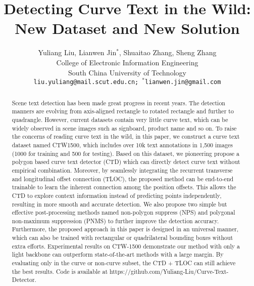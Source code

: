 \documentclass[10pt,twocolumn,letterpaper]{article}
\begin{document}
\title{Detecting Curve Text in the Wild: New Dataset and New Solution}

\author{Yuliang Liu, Lianwen Jin$^{*}$, Shuaitao Zhang, Sheng Zhang\\
College of Electronic Information Engineering\\
South China University of Technology \\
{\tt\small liu.yuliang@mail.scut.edu.cn; $^{*}$lianwen.jin@gmail.com}
}

\maketitle


\begin{abstract}
  Scene text detection has been made great progress in recent years. The detection manners are evolving from axis-aligned rectangle to rotated rectangle and further to quadrangle. However, current datasets contain very little curve text, which can be widely observed in scene images such as signboard, product name and so on. To raise the concerns of reading curve text in the wild, in this paper, we construct a curve text dataset named CTW1500, which includes over 10k text annotations in 1,500 images (1000 for training and 500 for testing). Based on this dataset, we pioneering propose a polygon based curve text detector (CTD) which can directly detect curve text without empirical combination. Moreover, by seamlessly integrating the recurrent transverse and longitudinal offset connection (TLOC), the proposed method can be end-to-end trainable to learn the inherent connection among the position offsets. This allows the CTD to explore context information instead of predicting points independently, resulting in more smooth and accurate detection. We also propose two simple but effective post-processing methods named non-polygon suppress (NPS) and polygonal non-maximum suppression (PNMS) to further improve the detection accuracy. Furthermore, the proposed approach in this paper is designed in an universal manner, which can also be trained with rectangular or quadrilateral bounding boxes without extra efforts. Experimental results on CTW-1500 demonstrate our method with only a light backbone can outperform state-of-the-art methods with a large margin. By evaluating only in the curve or non-curve subset, the CTD + TLOC can still achieve the best results. Code is available at {\color{blue} https://github.com/Yuliang-Liu/Curve-Text-Detector}.
\end{abstract}
\end{document}
